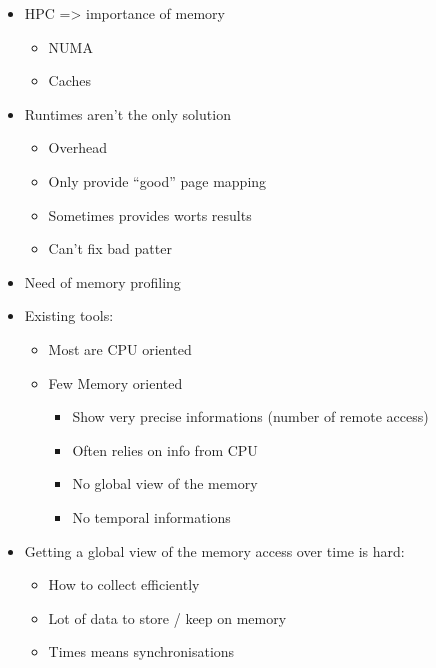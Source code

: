 \begin{itemize}
    \item HPC => importance of memory
        \begin{itemize}
            \item NUMA
            \item Caches
        \end{itemize}
    \item Runtimes aren't the only solution
        \begin{itemize}
            \item Overhead
            \item Only provide ``good'' page mapping
            \item Sometimes provides worts results
            \item Can't fix bad patter
        \end{itemize}
    \item  Need of memory profiling
    \item Existing tools:
        \begin{itemize}
            \item Most are CPU oriented
            \item Few Memory oriented
                \begin{itemize}
                    \item Show very precise informations (number of remote
                        access)
                    \item Often relies on info from CPU
                    \item No global view of the memory
                    \item No temporal informations
                \end{itemize}
        \end{itemize}
    \item Getting a global view of the memory access over time is hard:
        \begin{itemize}
            \item How to collect efficiently
            \item Lot of data to store / keep on memory
            \item Times means synchronisations
        \end{itemize}
\end{itemize}
